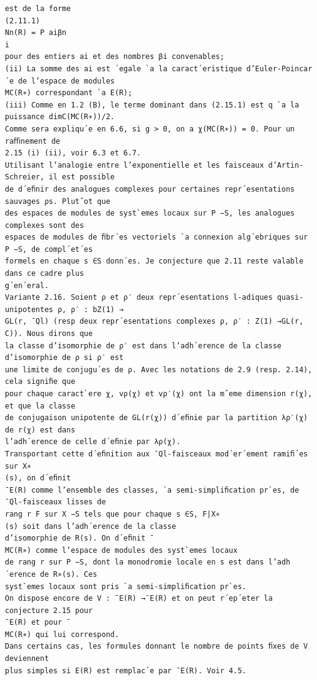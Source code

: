 \documentclass[11pt]{article}
\begin{document}
\begin{Verbatim}[breaklines=true,fontsize=\small]
est de la forme
(2.11.1)
Nn(R) = P aiβn
i
pour des entiers ai et des nombres βi convenables;
(ii) La somme des ai est ´egale `a la caract´eristique d’Euler-Poincar´e de l’espace de modules
MC(R∗) correspondant `a E(R);
(iii) Comme en 1.2 (B), le terme dominant dans (2.15.1) est q `a la puissance dimC(MC(R∗))/2.
Comme sera expliqu´e en 6.6, si g > 0, on a χ(MC(R∗)) = 0. Pour un raﬃnement de
2.15 (i) (ii), voir 6.3 et 6.7.
Utilisant l’analogie entre l’exponentielle et les faisceaux d’Artin-Schreier, il est possible
de d´eﬁnir des analogues complexes pour certaines repr´esentations sauvages ρs. Plutˆot que
des espaces de modules de syst`emes locaux sur P −S, les analogues complexes sont des
espaces de modules de ﬁbr´es vectoriels `a connexion alg´ebriques sur P −S, de compl´et´es
formels en chaque s ∈S donn´es. Je conjecture que 2.11 reste valable dans ce cadre plus
g´en´eral.
Variante 2.16. Soient ρ et ρ′ deux repr´esentations l-adiques quasi-unipotentes ρ, ρ′ : bZ(1) →
GL(r, ¯Ql) (resp deux repr´esentations complexes ρ, ρ′ : Z(1) →GL(r, C)). Nous dirons que
la classe d’isomorphie de ρ′ est dans l’adh´erence de la classe d’isomorphie de ρ si ρ′ est
une limite de conjugu´es de ρ. Avec les notations de 2.9 (resp. 2.14), cela signiﬁe que
pour chaque caract`ere χ, vρ(χ) et vρ′(χ) ont la mˆeme dimension r(χ), et que la classe
de conjugaison unipotente de GL(r(χ)) d´eﬁnie par la partition λρ′(χ) de r(χ) est dans
l’adh´erence de celle d´eﬁnie par λρ(χ).
Transportant cette d´eﬁnition aux ¯Ql-faisceaux mod´er´ement ramiﬁ´es sur X∗
(s), on d´eﬁnit
¯E(R) comme l’ensemble des classes, `a semi-simpliﬁcation pr`es, de ¯Ql-faisceaux lisses de
rang r F sur X −S tels que pour chaque s ∈S, F|X∗
(s) soit dans l’adh´erence de la classe
d’isomorphie de R(s). On d´eﬁnit ¯
MC(R∗) comme l’espace de modules des syst`emes locaux
de rang r sur P −S, dont la monodromie locale en s est dans l’adh´erence de R∗(s). Ces
syst`emes locaux sont pris `a semi-simpliﬁcation pr`es.
On dispose encore de V : ¯E(R) →¯E(R) et on peut r´ep´eter la conjecture 2.15 pour
¯E(R) et pour ¯
MC(R∗) qui lui correspond.
Dans certains cas, les formules donnant le nombre de points ﬁxes de V deviennent
plus simples si E(R) est remplac´e par ¯E(R). Voir 4.5.


\end{Verbatim}
\end{document}
